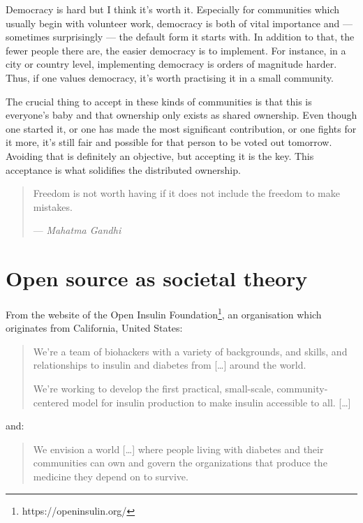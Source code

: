 Democracy is hard but I think it’s worth it. Especially for communities which usually begin with volunteer work, democracy is both of vital importance and — sometimes surprisingly — the default form it starts with. In addition to that, the fewer people there are, the easier democracy is to implement. For instance, in a city or country level, implementing democracy is orders of magnitude harder. Thus, if one values democracy, it’s worth practising it in a small community.

The crucial thing to accept in these kinds of communities is that this is everyone’s baby and that ownership only exists as shared ownership. Even though one started it, or one has made the most significant contribution, or one fights for it more, it’s still fair and possible for that person to be voted out tomorrow. Avoiding that is definitely an objective, but accepting it is the key. This acceptance is what solidifies the distributed ownership.

\begin{quote}
    Freedom is not worth having if it does not include the freedom to make mistakes.

    — \emph{Mahatma Gandhi}
\end{quote}

\section{Open source as societal theory}

From the website of the Open Insulin Foundation\footnote{https://openinsulin.org/}, an organisation which originates from California, United States:

\begin{quote}
    We’re a team of biohackers with a variety of backgrounds, and skills, and relationships to insulin and diabetes from [\dots] around the world.

    We’re working to develop the first practical, small-scale, community-centered model for insulin production to make insulin accessible to all. [\dots]
\end{quote}

and:

\begin{quote}
    We envision a world [\dots] where people living with diabetes and their communities can own and govern the organizations that produce the medicine they depend on to survive.
\end{quote}

